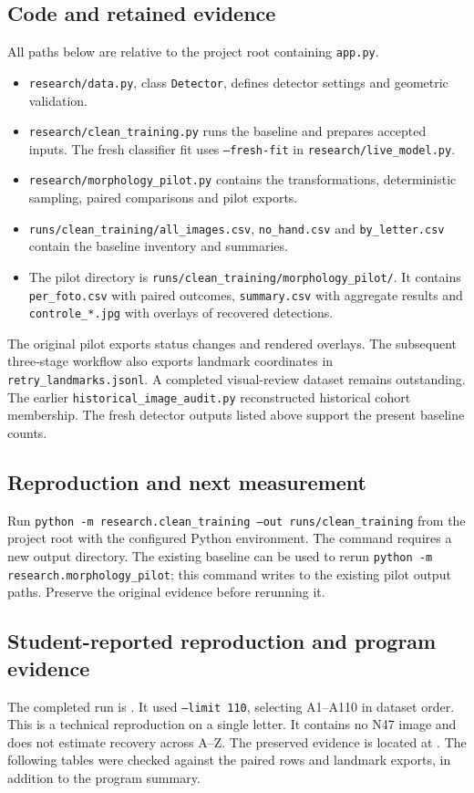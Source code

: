 \subsection{Code and retained evidence}
All paths below are relative to the project root containing \texttt{app.py}.
\begin{itemize}
\item \texttt{research/data.py}, class \texttt{Detector}, defines detector settings and geometric validation.
\item \texttt{research/clean\_training.py} runs the baseline and prepares accepted inputs. The fresh classifier fit uses \texttt{--fresh-fit} in \texttt{research/live\_model.py}.
\item \texttt{research/morphology\_pilot.py} contains the transformations, deterministic sampling, paired comparisons and pilot exports.
\item \texttt{runs/clean\_training/all\_images.csv}, \texttt{no\_hand.csv} and \texttt{by\_letter.csv} contain the baseline inventory and summaries.
\item The pilot directory is \texttt{runs/clean\_training/morphology\_pilot/}. It contains \texttt{per\_foto.csv} with paired outcomes, \texttt{summary.csv} with aggregate results and \texttt{controle\_*.jpg} with overlays of recovered detections.
\end{itemize}

The original pilot exports status changes and rendered overlays. The subsequent three-stage workflow also exports landmark coordinates in \texttt{retry\_landmarks.jsonl}. A completed visual-review dataset remains outstanding. The earlier \texttt{historical\_image\_audit.py} reconstructed historical cohort membership. The fresh detector outputs listed above support the present baseline counts.

\subsection{Reproduction and next measurement}
Run \texttt{python -m research.clean\_training --out runs/clean\_training}
from the project root with the configured Python environment. The command requires a new output directory. The existing baseline can be used to rerun \texttt{python -m research.morphology\_pilot}; this command writes to the existing pilot output paths. Preserve the original evidence before rerunning it.

\clearpage
\subsection{Student-reported reproduction and program evidence}
\label{app:rq2-reproduction}
The completed run is .
It used \texttt{--limit 110}, selecting A1--A110 in dataset order. This is a technical reproduction on a single letter. It contains no N47 image and does not estimate recovery across A--Z.
The preserved evidence is located at .
The following tables were checked against the paired rows and landmark exports, in addition to the program summary.

